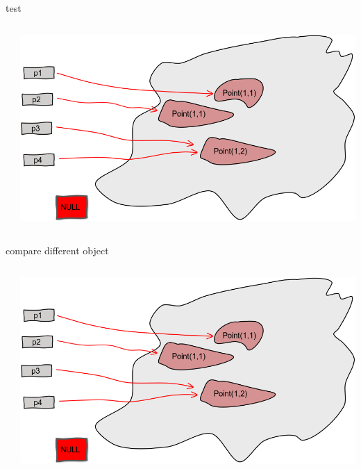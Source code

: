 \documentclass[a4paper, 11pt]{beamer}
\begin{document}
\begin{frame}{test}

\begin{columns}
    \begin{column}{.3\linewidth}
      \inputminted[bgcolor=bg, fontsize=\tiny]{java}{./src/equal/EqualFalse.java}        
    \end{column}
\vline
    \begin{column}{.5\linewidth}
       \includegraphics[scale=0.2]{img/equal.png}
   
    \end{column}
  \end{columns}
\end{frame}




\begin{frame}{compare different object}

\begin{columns}
    \begin{column}{.3\linewidth}
      \inputminted[bgcolor=bg, fontsize=\tiny]{java}{./src/equal/EqualFalseResult.java}        
    \end{column}
\vline
    \begin{column}{.5\linewidth}
       \includegraphics[scale=0.2]{img/equal.png}
   
    \end{column}
  \end{columns}
\end{frame}
\end{document}
